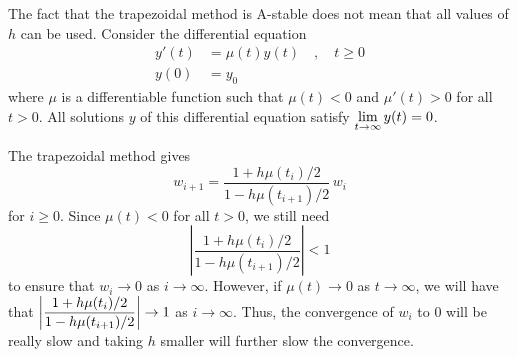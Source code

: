 \begin{rmk}
The fact that the trapezoidal method is A-stable does not mean
that all values of $h$ can be used.  Consider the differential
equation 
\[
\begin{split}
y'(t) &= \mu(t) y(t) \quad , \quad t\geq 0 \\
y(0) &= y_0
\end{split}
\]
where $\mu$ is a differentiable function such that
$\mu(t) < 0$ and $\mu'(t) > 0$ for all $t>0$.  All solutions $y$ of 
this differential equation satisfy
$\displaystyle \lim_{t\to \infty} y(t) =0$.

The trapezoidal method gives
\[
w_{i+1} = \frac{1+h\mu(t_i)/2}{1-h\mu(t_{i+1})/2}\, w_i
\]
for $i \geq 0$.  Since $\mu(t) < 0$ for all $t>0$, we still need
\[
\left| \frac{1+h\mu(t_i)/2}{1-h\mu(t_{i+1})/2} \right| < 1
\]
to ensure that $w_i \to 0$ as $i \to \infty$.  However, if
$\mu(t) \to 0$ as $t \to \infty$, we will have that
$\displaystyle \left| \frac{1+h\mu(t_i)/2}{1-h\mu(t_{i+1})/2}
\right| \to 1$ as $i \to \infty$.  Thus, the convergence of $w_i$ to
$0$ will be really slow and taking $h$ smaller will further slow the
convergence.
\end{rmk}

